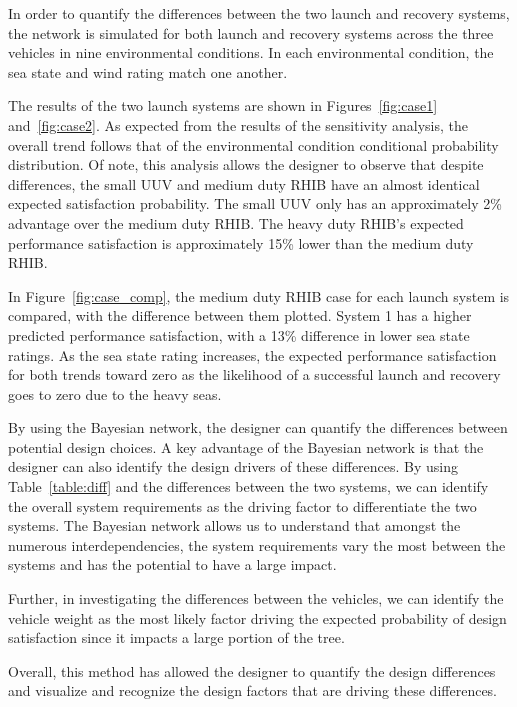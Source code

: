 \documentclass{svproc}
\begin{document}
In order to quantify the differences between the two launch and recovery systems, the network is simulated for both launch and recovery systems across the three vehicles in nine environmental conditions. In each environmental condition, the sea state and wind rating match one another. 

The results of the two launch systems are shown in Figures~\ref{fig:case1} and~\ref{fig:case2}. As expected from the results of the sensitivity analysis, the overall trend follows that of the environmental condition conditional probability distribution. Of note, this analysis allows the designer to observe that despite differences, the small UUV and medium duty RHIB have an almost identical expected satisfaction probability. The small UUV only has an approximately 2\% advantage over the medium duty RHIB. The heavy duty RHIB's expected performance satisfaction is approximately 15\% lower than the medium duty RHIB.  

In Figure~\ref{fig:case_comp}, the medium duty RHIB case for each launch system is compared, with the difference between them plotted. System 1 has a higher predicted performance satisfaction, with a 13\% difference in lower sea state ratings. As the sea state rating increases, the expected performance satisfaction for both trends toward zero as the likelihood of a successful launch and recovery goes to zero due to the heavy seas. 

By using the Bayesian network, the designer can quantify the differences between potential design choices. A key advantage of the Bayesian network is that the designer can also identify the design drivers of these differences. By using Table~\ref{table:diff} and the differences between the two systems, we can identify the overall system requirements as the driving factor to differentiate the two systems. The Bayesian network allows us to understand that amongst the numerous interdependencies, the system requirements vary the most between the systems and has the potential to have a large impact. 

Further, in investigating the differences between the vehicles, we can identify the vehicle weight as the most likely factor driving the expected probability of design satisfaction since it impacts a large portion of the tree. 

Overall, this method has allowed the designer to quantify the design differences and visualize and recognize the design factors that are driving these differences. 


\FloatBarrier
\end{document}
